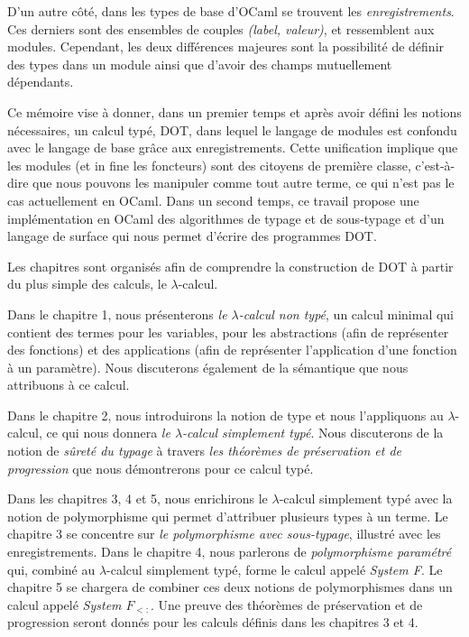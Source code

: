 D'un autre côté, dans les types de base d'OCaml se trouvent les
\textit{enregistrements}. Ces derniers sont des ensembles de couples
\textit{(label, valeur)}, et ressemblent aux modules. Cependant, les deux
différences majeures sont la possibilité de définir des types dans un
module ainsi que d'avoir des champs mutuellement dépendants.

Ce mémoire vise à donner, dans un premier temps et après avoir défini les notions
nécessaires, un calcul typé, DOT\cite{WF-DOT-2016}, dans lequel le
langage de modules est confondu avec le langage de base grâce aux
enregistrements. Cette unification implique
que les modules (et in fine les foncteurs) sont des citoyens de première
classe, c'est-à-dire que nous pouvons les manipuler comme tout autre terme, ce qui
n'est pas le cas actuellement en OCaml.
Dans un second temps, ce travail propose une implémentation en OCaml
des algorithmes de typage et de sous-typage et d'un langage de surface qui nous
permet d'écrire des programmes DOT.


Les chapitres sont organisés afin de comprendre la construction de DOT
à partir du plus simple des calculs, le $\lambda$-calcul.

Dans le chapitre 1, nous présenterons \textit{le $\lambda$-calcul non typé}, un calcul
minimal qui contient des termes pour les variables, pour les abstractions (afin
de représenter des fonctions) et des applications (afin de représenter
l'application d'une fonction à un paramètre). Nous discuterons également de la
sémantique que nous attribuons à ce calcul. 

Dans le chapitre 2, nous introduirons la notion de type et nous l'appliquons au
$\lambda$-calcul, ce qui nous donnera \textit{le $\lambda$-calcul simplement typé}. Nous
discuterons de la notion de \textit{sûreté du typage} à travers \textit{les théorèmes
de préservation et de progression} que nous démontrerons pour ce calcul typé.

Dans les chapitres 3, 4 et 5, nous enrichirons le $\lambda$-calcul simplement
typé avec la notion de polymorphisme qui permet d'attribuer plusieurs types à un
terme. Le chapitre 3 se concentre sur \textit{le polymorphisme avec sous-typage},
illustré avec les enregistrements.
Dans le chapitre 4, nous parlerons de
\textit{polymorphisme paramétré} qui, combiné au $\lambda$-calcul simplement typé, forme
le calcul appelé \textit{System F}.
Le chapitre 5 se chargera de combiner ces deux notions de polymorphismes dans un
calcul appelé \textit{System $F_{<:}$}.
Une preuve des théorèmes de préservation et de progression seront donnés pour
les calculs définis dans les chapitres 3 et 4.


